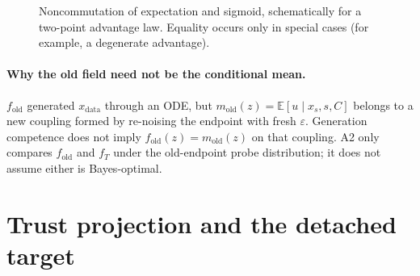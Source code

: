 \documentclass[11pt,a4paper]{article}
\newcommand{\E}{\mathbb{E}}
\newcommand{\old}{\mathrm{old}}
\newcommand{\data}{\mathrm{data}}
\theoremstyle{plain}
\theoremstyle{definition}
\begin{document}
\begin{figure}[htbp]
\centering
{}
\caption{Noncommutation of expectation and sigmoid, schematically for a two-point advantage law.
Equality occurs only in special cases (for example, a degenerate advantage).}
\label{fig:sigmoid-bias}
\end{figure}

\paragraph{Why the old field need not be the conditional mean.}
$f_{\old}$ generated $x_{\data}$ through an ODE, but $m_{\old}(z)=\E[u\mid x_s,s,C]$ belongs to a
new coupling formed by re-noising the endpoint with fresh $\varepsilon$.  Generation competence
does not imply $f_{\old}(z)=m_{\old}(z)$ on that coupling.  A2 only compares $f_{\old}$ and $f_T$
under the old-endpoint probe distribution; it does not assume either is Bayes-optimal.

\section{Trust projection and the detached target}
\label{sec:trust}
\end{document}
